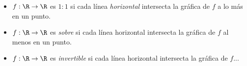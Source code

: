 \begin{observacion}
	\begin{itemize}
		\item $f:\R \to \R$ es \emph{$1:1$} si cada línea \emph{horizontal} intersecta la gráfica de $f$ a lo más en un punto.
		\item $f:\R \to \R$ es \emph{sobre} si cada línea horizontal intersecta la gráfica de $f$ al menos en un punto.
		\item $f:\R \to \R$ es \emph{invertible} si cada línea horizontal intersecta la gráfica de $f$...
	\end{itemize}
	
\end{observacion}




